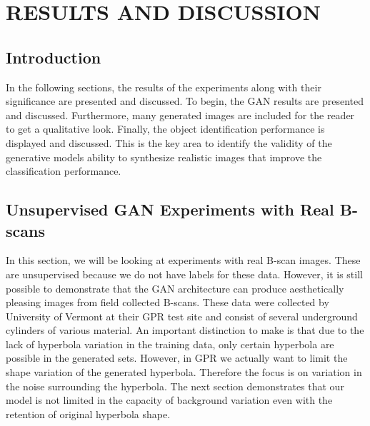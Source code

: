 \doublespacing
\chapter{RESULTS AND DISCUSSION}\label{results}


\section{Introduction}
\hspace{0.5in}In the following sections, the results of the experiments along with their significance are presented and discussed. To begin, the GAN results are presented and discussed. Furthermore, many generated images are included for the reader to get a qualitative look. Finally, the object identification performance is displayed and discussed. This is the key area to identify the validity of the generative models ability to synthesize realistic images that improve the classification performance.

\section{Unsupervised GAN Experiments with Real B-scans}\label{Unsupervised}
\hspace{0.5in}In this section, we will be looking at experiments with real B-scan images. These are unsupervised because we do not have labels for these data. However, it is still possible to demonstrate that the GAN architecture can produce aesthetically pleasing images from field collected B-scans. These data were collected by University of Vermont at their GPR test site and consist of several underground cylinders of various material. An important distinction to make is that due to the lack of hyperbola variation in the training data, only certain hyperbola are possible in the generated sets. However, in GPR we actually want to limit the shape variation of the generated hyperbola. Therefore the focus is on variation in the noise surrounding the hyperbola. The next section demonstrates that our model is not limited in the capacity of background variation even with the retention of original hyperbola shape.


